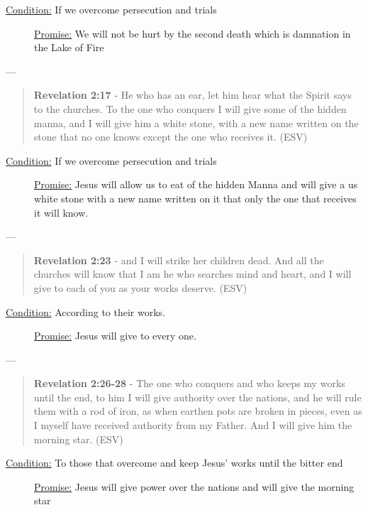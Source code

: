 \documentclass[11pt]{article}
\begin{document}
\begin{description}
\item[{\uline{Condition:} If we overcome persecution and trials}] \uline{Promise:} We will not be hurt by the second death which is damnation in the Lake of Fire
\end{description}

---

\begin{quote}
\textbf{Revelation 2:17} - He who has an ear, let him hear what the Spirit says to the churches. To the one who conquers I will give some of the hidden manna, and I will give him a white stone, with a new name written on the stone that no one knows except the one who receives it. (ESV)
\end{quote}

\begin{description}
\item[{\uline{Condition:} If we overcome persecution and trials}] \uline{Promise:} Jesus will allow us to eat of the hidden Manna and will give a us white stone with a new name written on it that only the one that receives it will know.
\end{description}

---

\begin{quote}
\textbf{Revelation 2:23} - and I will strike her children dead. And all the churches will know that I am he who searches mind and heart, and I will give to each of you as your works deserve. (ESV)
\end{quote}

\begin{description}
\item[{\uline{Condition:} According to their works.}] \uline{Promise:} Jesus will give to every one.
\end{description}

---

\begin{quote}
\textbf{Revelation 2:26-28} - The one who conquers and who keeps my works until the end, to him I will give authority over the nations, and he will rule them with a rod of iron, as when earthen pots are broken in pieces, even as I myself have received authority from my Father. And I will give him the morning star. (ESV)
\end{quote}

\begin{description}
\item[{\uline{Condition:} To those that overcome and keep Jesus' works until the bitter end}] \uline{Promise:} Jesus will give power over the nations and will give the morning star
\end{description}
\end{document}
